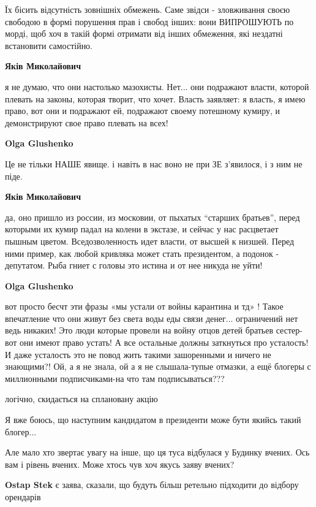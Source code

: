 \begin{itemize}
\begin{itemize}
Їх бісить відсутність зовнішніх обмежень. Саме звідси - зловживання своєю
свободою в формі порушення прав і свобод інших: вони ВИПРОШУЮТЬ по морді, щоб
хоч в такій формі отримати від інших обмеження, які нездатні встановити
самостійно.

\textbf{Яків Миколайович} 

я не думаю, что они настолько мазохисты. Нет... они подражают власти, которой
плевать на законы, которая творит, что хочет. Власть заявляет: я власть, я имею
право, вот они и подражают ей, подражают своему потешному кумиру, и демонстрируют
свое право плевать на всех!


\textbf{Olga Glushenko} 

Це не тільки НАШЕ явище. і навіть в нас воно не при ЗЕ з'явилося, і з ним не
піде.


\textbf{Яків Миколайович} 

да, оно пришло из россии, из московии, от пыхатых \enquote{старших братьев}, перед которыми
их кумир падал на колени в экстазе, и сейчас у нас расцветает пышным цветом.
Вседозволенность идет власти, от высшей к низшей. Перед ними пример, как любой
кривляка может стать президентом, а подонок - депутатом. Рыба гниет с головы это
истина и от нее никуда не уйти!

\textbf{Olga Glushenko} 

вот просто бесчт эти фразы «мы устали от войны карантина и тд» ! Такое
впечатление что они живут без света воды еды связи денег... ограничений нет ведь
никаких! Это люди которые провели на войну отцов детей братьев сестер-вот они
имеют право устать! А все остальные должны заткнуться про усталость! И даже
усталость это не повод жить такими зашоренными и ничего не знающими?! Ой, а я
не знала, ой а я не слышала-тупые отмазки, а ещё блогеры с миллионными
подписчиками-на что там подписываться???

\end{itemize} %

логічно, скидається на сплановану акцію

Я вже боюсь, що наступним кандидатом в президенти може бути якийсь такий блогер...


Але мало хто звертає увагу на інше, що ця туса відбулася у Будинку вчених. Ось
вам і рівень вчених. Може хтось чув хоч якусь заяву вчених?

\begin{itemize} %
\textbf{Ostap Stek} є заява, сказали, що будуть більш ретельно підходити до відбору орендарів
\end{itemize} %


\end{itemize}
